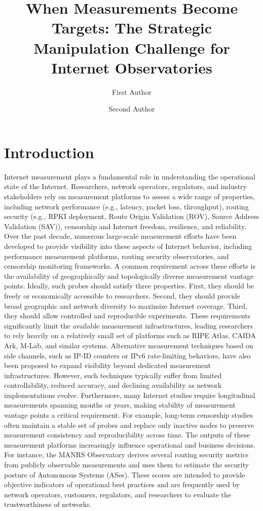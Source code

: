 \documentclass[sigconf, 10pt, anonymous, nonacm]{acmart}
\title{When Measurements Become Targets: The Strategic Manipulation Challenge for Internet Observatories}
\author{First Author}
\affiliation{%
  \institution{First Institution}
  \city{City}
  \country{Country}
}
\author{Second Author}
\affiliation{%
  \institution{Second Institution}
  \city{City}
  \country{Country}
}
\begin{document}
\maketitle

\section{Introduction}

Internet measurement plays a fundamental role in understanding the operational state of the Internet. Researchers, network operators, regulators, and industry stakeholders rely on measurement platforms to assess a wide range of properties, including network performance (e.g., latency, packet loss, throughput), routing security (e.g., RPKI deployment, Route Origin Validation (ROV), Source Address Validation (SAV)), censorship and Internet freedom, resilience, and reliability. Over the past decade, numerous large-scale measurement efforts have been developed to provide visibility into these aspects of Internet behavior, including performance measurement platforms, routing security observatories, and censorship monitoring frameworks.
A common requirement across these efforts is the availability of geographically and topologically diverse measurement vantage points. Ideally, such probes should satisfy three properties. First, they should be freely or economically accessible to researchers. Second, they should provide broad geographic and network diversity to maximize Internet coverage. Third, they should allow controlled and reproducible experiments. These requirements significantly limit the available measurement infrastructures, leading researchers to rely heavily on a relatively small set of platforms such as RIPE Atlas, CAIDA Ark, M-Lab, and similar systems.
Alternative measurement techniques based on side channels, such as IP-ID counters or IPv6 rate-limiting behaviors, have also been proposed to expand visibility beyond dedicated measurement infrastructures. However, such techniques typically suffer from limited controllability, reduced accuracy, and declining availability as network implementations evolve. Furthermore, many Internet studies require longitudinal measurements spanning months or years, making stability of measurement vantage points a critical requirement. For example, long-term censorship studies often maintain a stable set of probes and replace only inactive nodes to preserve measurement consistency and reproducibility across time.
The outputs of these measurement platforms increasingly influence operational and business decisions. For instance, the MANRS Observatory derives several routing security metrics from publicly observable measurements and uses them to estimate the security posture of Autonomous Systems (ASes). These scores are intended to provide objective indicators of operational best practices and are frequently used by network operators, customers, regulators, and researchers to evaluate the trustworthiness of networks.
\end{document}
